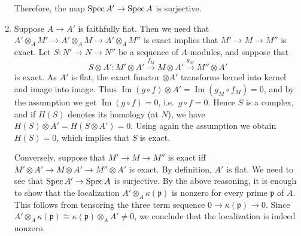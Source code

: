\documentclass[12pt]{article}
\begin{document}
\begin{enumerate}
Therefore, the map $\operatorname{Spec} A' \to \operatorname{Spec} A$ is surjective.
\item Suppose $A\to A'$ is faithfully flat. Then we need that $A' \otimes_A M' \to A' \otimes_A M \to A' \otimes_A M''$ is exact implies that $M' \to M \to M''$ is exact.
Let $S : N' \longrightarrow N \longrightarrow N''$ be a sequence of $A$-modules, and suppose that
$$S \otimes A' : M' \otimes A' \xrightarrow{f_M} M \otimes A' \xrightarrow{g_M} M'' \otimes A'$$
is exact. As $A'$ is flat, the exact functor $\otimes A'$ transforms kernel into kernel and image into image. Thus $\operatorname{Im}(g \circ f) \otimes A' = \operatorname{Im}(g_M \circ f_M) = 0$, and by the assumption we get $\operatorname{Im}(g \circ f) = 0$, i.e.\ $g \circ f = 0$. Hence $S$ is a complex, and if $H(S)$ denotes its homology (at $N$), we have $H(S) \otimes A' = H(S \otimes A') = 0$. Using again the assumption we obtain $H(S) = 0$, which implies that $S$ is exact.

Conversely, suppose that $M' \to M \to M''$ is exact iff $M' \otimes A' \to M \otimes A' \to M'' \otimes A'$ is exact. By definition, $A'$ is flat. We need to see that $\operatorname{Spec} A' \to \operatorname{Spec} A$ is surjective. By the above reasoning, it is enough to show that the localization $A' \otimes_A \kappa(\mathfrak p)$ is nonzero for every prime $\mathfrak p$ of $A$. This follows from tensoring the three term sequence $0 \to \kappa(\mathfrak p) \to 0$. Since $A' \otimes_A \kappa(\mathfrak p) \cong \kappa(\mathfrak p) \otimes_A A' \neq 0$, we conclude that the localization is indeed nonzero.
\end{enumerate}
\end{document}
